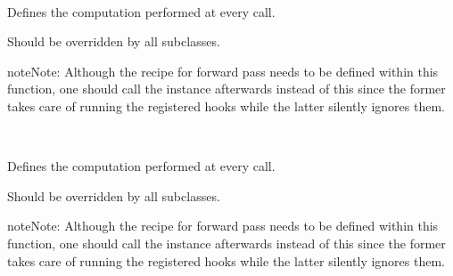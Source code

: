 \documentclass[letterpaper,10pt,english]{sphinxmanual}
\begin{document}

\begin{fulllineitems}
\label{\detokenize{usage/quickstart:unet.UNet}}~

\begin{fulllineitems}
\label{\detokenize{usage/quickstart:unet.UNet.forward}}
Defines the computation performed at every call.

Should be overridden by all subclasses.

\begin{sphinxadmonition}{note}{Note:}
Although the recipe for forward pass needs to be defined within
this function, one should call the  instance afterwards
instead of this since the former takes care of running the
registered hooks while the latter silently ignores them.
\end{sphinxadmonition}

\end{fulllineitems}


\end{fulllineitems}


\begin{fulllineitems}
\label{\detokenize{usage/quickstart:unet.UNet_down_block}}~

\begin{fulllineitems}
\label{\detokenize{usage/quickstart:unet.UNet_down_block.forward}}
Defines the computation performed at every call.

Should be overridden by all subclasses.

\begin{sphinxadmonition}{note}{Note:}
Although the recipe for forward pass needs to be defined within
this function, one should call the  instance afterwards
instead of this since the former takes care of running the
registered hooks while the latter silently ignores them.
\end{sphinxadmonition}

\end{fulllineitems}


\end{fulllineitems}
\end{document}
